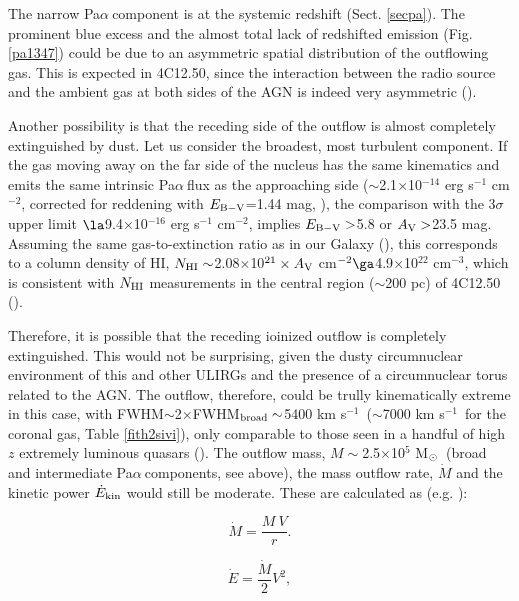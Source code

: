 \documentclass{aa}
\newcommand{\kms}{km s$^{-1}$~}
\newcommand{\pa}{Pa$\alpha~$}
\newcommand{\msun}{M$_{\rm \odot}$~}
\begin{document}
The  narrow  \pa component is at the systemic redshift  (Sect. \ref{secpa}). 
The prominent  blue  excess and the almost total lack of redshifted emission   (Fig. \ref{pa1347}) could be due to  an asymmetric spatial distribution of the outflowing gas. This is  expected in 4C12.50, since the  interaction between the radio source  and the ambient gas at both sides of the AGN is indeed very asymmetric (\citealt{Morganti2004}).  
  
Another possibility is that   the  receding side of the outflow  is almost completely extinguished by dust.
 Let us consider the broadest, most turbulent component.  If the gas moving away on the far side of the nucleus has the same kinematics and emits the same intrinsic \pa flux as the approaching side ($\sim$2.1$\times$10$^{-14}$ erg s$^{-1}$ cm$^{-2}$, corrected for reddening with $E_{\rm B-V}$=1.44 mag, \citealt{Holt2003}), the comparison with the 3$\sigma$ upper limit $\la$9.4$\times$10$^{-16}$ erg s$^{-1}$ cm$^{-2}$, implies $E_{\rm B-V}>$5.8 or $A_{\rm V}>$23.5 mag.  Assuming the same  gas-to-extinction ratio as in our Galaxy (\citealt{Zhu2017}), this corresponds to  a column density of HI, 
$N_{\rm HI} \sim$2.08$\times$10$^{21} \times A_{\rm V}$  cm$^{-2}\ga$4.9$\times$10$^{22}$ cm$^{-3}$, which is consistent with   $N_{\rm HI}$ measurements in the central region ($\sim$200 pc) of 4C12.50 (\citealt{Morganti2013}). 


Therefore, it is possible that the receding ioinized outflow is completely extinguished. This would not be surprising, given  the dusty circumnuclear environment of this and other ULIRGs and the  presence of a circumnuclear torus related to the 
AGN. The  outflow, therefore, could be trully kinematically  extreme in this case, with FWHM$\sim$2$\times$FWHM$_{\rm broad}\sim$5400 \kms ($\sim$7000 \kms for the coronal gas, Table \ref{fith2sivi}), only comparable to those seen in a handful of high $z$ extremely luminous quasars (\citealt{Perrotta2019,Villar2020}). 
The  outflow  mass, $M\sim$2.5$\times$10$^5$ \msun (broad and intermediate \pa components, see above), the mass outflow rate, $\dot{M}$ and  the kinetic power $\dot E_{\rm kin}$ would still be moderate. These  are  calculated as (e.g. \citealt{Rose2018}): 

\begin{equation}
\dot{M} =\frac{M~V}{r} .
\label{eqn:mass}
\end{equation}

\begin{equation}
\dot{E} =\frac{\dot{M}}{2} V^{2} ,
\label{eqn:pow}
\end{equation}
\end{document}
